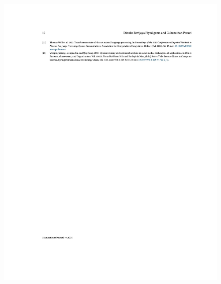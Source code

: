\begin{figure}[h!]
\centering
\includegraphics[width=\textwidth]{images/appendix/papers/review/A Review on Pushing the Limits of Baseline Recommendation Systems with the integration of Opinion Mining & Information Retrieval Techniques 10.jpeg}
\end{figure}
